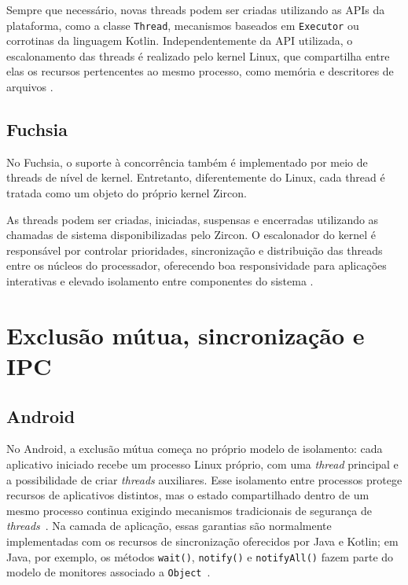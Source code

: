 \documentclass[12pt,a4paper]{article}
\begin{document}
Sempre que necessário, novas threads podem ser criadas utilizando as APIs da
plataforma, como a classe \texttt{Thread}, mecanismos baseados em
\texttt{Executor} ou corrotinas da linguagem Kotlin. Independentemente da API
utilizada, o escalonamento das threads é realizado pelo kernel Linux, que
compartilha entre elas os recursos pertencentes ao mesmo processo, como memória
e descritores de arquivos \cite{android_process_threads}.

\subsection{Fuchsia}

No Fuchsia, o suporte à concorrência também é implementado por meio de threads
de nível de kernel. Entretanto, diferentemente do Linux, cada thread é tratada
como um objeto do próprio kernel Zircon.

As threads podem ser criadas, iniciadas, suspensas e encerradas utilizando as
chamadas de sistema disponibilizadas pelo Zircon. O escalonador do kernel é
responsável por controlar prioridades, sincronização e distribuição das threads
entre os núcleos do processador, oferecendo boa responsividade para aplicações
interativas e elevado isolamento entre componentes do sistema
\cite{zircon_thread}.

\section{Exclusão mútua, sincronização e IPC}
\label{sec:ipc}

\subsection{Android}

No Android, a exclusão mútua começa no próprio modelo de isolamento: cada
aplicativo iniciado recebe um processo Linux próprio, com uma \emph{thread}
principal e a possibilidade de criar \emph{threads} auxiliares. Esse isolamento
entre processos protege recursos de aplicativos distintos, mas o estado
compartilhado dentro de um mesmo processo continua exigindo mecanismos
tradicionais de segurança de \emph{threads}~\cite{android_process_threads}. Na
camada de aplicação, essas garantias são normalmente implementadas com os
recursos de sincronização oferecidos por Java e Kotlin; em Java, por exemplo, os
métodos \texttt{wait()}, \texttt{notify()} e \texttt{notifyAll()} fazem parte do
modelo de monitores associado a \texttt{Object}~\cite{java_object}.
\end{document}
